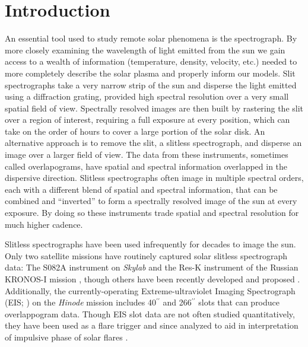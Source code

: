 
\section{Introduction}\label{sec:intro}
	
	An essential tool used to study remote solar phenomena is the spectrograph.
	By more closely examining the wavelength of light emitted from the sun we gain access to a wealth of information (temperature, density, velocity, etc.) needed to more completely describe the solar plasma and properly inform our models.
	Slit spectrographs take a very narrow strip of the sun and disperse the light emitted using a diffraction grating, provided high spectral resolution over a very small spatial field of view.
	Spectrally resolved images are then built by rastering the slit over a region of interest, requiring a full exposure at every position, which can take on the order of hours to cover a large portion of the solar disk.
	An alternative approach is to remove the slit, a slitless spectrograph, and disperse an image over a larger field of view.
	The data from these instruments, sometimes called overlapograms, have spatial and spectral information overlapped in the dispersive direction.
	Slitless spectrographs often image in multiple spectral orders, each with a different blend of spatial and spectral information, that can be combined and ``inverted'' to form a spectrally resolved image of the sun at every exposure.
	By doing so these instruments trade spatial and spectral resolution for much higher cadence.

	Slitless spectrographs have been used infrequently for decades to image the sun.
	Only two satellite missions have routinely captured solar slitless spectrograph data: The S082A instrument on {\it Skylab} \citep{Tousey1973} and the Res-K instrument of the Russian KRONOS-I mission \citep{Zhitnik1998}, though others have been recently developed and proposed \citep{winebarger2019,golub2020}. 
	Additionally, the currently-operating Extreme-ultraviolet Imaging Spectrograph (EIS; \citet{culhane2007}) on the {\it Hinode} mission \citep{kosugi2007} includes 40$^{\prime\prime}$ and 266$^{\prime\prime}$ slots that can produce overlappogram data.
	Though EIS slot data are not often studied quantitatively, they have been used as a flare trigger and since analyzed to aid in interpretation of impulsive phase of solar flares \citep{harra2017,harra2020}.
 

